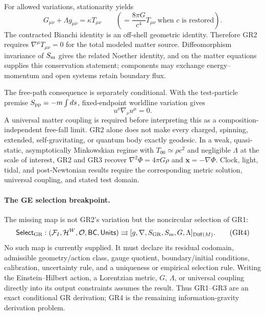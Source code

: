 \documentclass[11pt,a4paper]{article}
\theoremstyle{remark}
\newcommand{\Hist}{\mathcal H}
\newcommand{\Obs}{\mathcal O}
\begin{document}
For allowed variations, stationarity yields
\[
 \boxed{G_{\mu\nu}+\Lambda g_{\mu\nu}=\kappa T_{\mu\nu}}
 \qquad\left(=\frac{8\pi G}{c^4}T_{\mu\nu}\ \text{when $c$ is restored}\right).
 \tag{GR2}
\]
The contracted Bianchi identity is an off-shell geometric identity. Therefore
GR2 requires $\nabla^\mu T_{\mu\nu}=0$ for the total modeled matter source.
Diffeomorphism invariance of $S_{\rm m}$ gives the related Noether identity, and
on the matter equations supplies this conservation statement; components may
exchange energy--momentum and open systems retain boundary flux.

The free-path consequence is separately conditional. With the test-particle
premise $S_{\rm pp}=-m\int ds$, fixed-endpoint worldline variation gives
\[
 \boxed{u^\nu\nabla_\nu u^\mu=0.}\tag{GR3}
\]
A universal matter coupling is required before interpreting this as a
composition-independent free-fall limit. GR2 alone does not make every charged,
spinning, extended, self-gravitating, or quantum body exactly geodesic. In a
weak, quasi-static, asymptotically Minkowskian regime with
$T_{00}\simeq\rho c^2$ and negligible $\Lambda$ at the scale of interest, GR2
and GR3 recover $\nabla^2\Phi=4\pi G\rho$ and
$\ddot{\mathbf x}=-\nabla\Phi$. Clock, light, tidal, and post-Newtonian results
require the corresponding metric solution, universal coupling, and stated
test domain.

\paragraph{The GE selection breakpoint.}
The missing map is not GR2's variation but the noncircular selection of GR1:
\[
 \mathsf{Select}_{\rm GR}:
 (\mathcal F_I,\Hist^W,\Obs,\mathsf{BC},\mathsf{Units})
 \rightrightarrows
 [g,\nabla,S_{\rm GR},S_{\rm m},G,\Lambda]_{\mathrm{Diff}(M)}.
 \tag{GR4}
\]
No such map is currently supplied. It must declare its residual codomain,
admissible geometry/action class, gauge quotient, boundary/initial conditions,
calibration, uncertainty rule, and a uniqueness or empirical selection rule.
Writing the Einstein--Hilbert action, a Lorentzian metric, $G$, $\Lambda$, or
universal coupling directly into its output constraints assumes the result.
Thus GR1--GR3 are an exact conditional GR derivation; GR4 is the remaining
information-gravity derivation problem.
\end{document}
